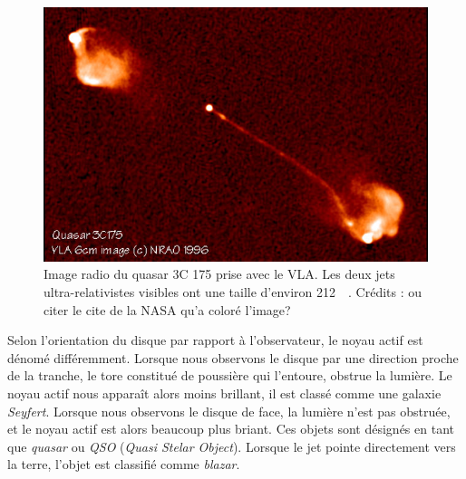 \documentclass[11pt, twoside, a4paper, openright]{report}
\begin{document}
\begin{figure}
  \centering
  \includegraphics[scale=0.4]{qso_jets}
  \caption{Image radio du quasar 3C 175 prise avec le VLA. Les deux jets ultra-relativistes visibles ont une taille d'environ \SI{212}{\perh\kpc}. Crédits : \cite{CITE http://adsabs.harvard.edu/full/1994AJ....108..766B} ou citer le cite de la NASA qu'a coloré l'image?}
  \label{fig:qso_jets}
\end{figure}
Selon l'orientation du disque par rapport à l'observateur, le noyau actif est dénomé différemment. Lorsque nous observons le disque par une direction proche de la tranche, le tore constitué de poussière qui l'entoure, obstrue la lumière. Le noyau actif nous apparaît alors moins brillant, il est classé comme une galaxie \emph{Seyfert}. Lorsque nous observons le disque de face, la lumière n'est pas obstruée, et le noyau actif est alors beaucoup plus briant. Ces objets sont désignés en tant que \emph{quasar} ou \emph{QSO} (\emph{Quasi Stelar Object}). Lorsque le jet pointe directement vers la terre, l'objet est classifié comme \emph{blazar}.
\end{document}
